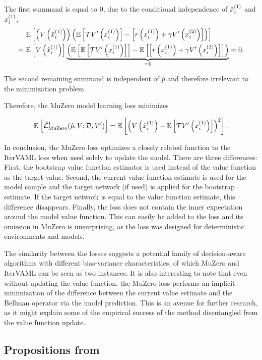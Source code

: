 The first summand is equal to $0$, due to the conditional independence of $\hat{x}^{(1)}_i$ and $x^{(1)}_i$,
\begin{align*}
    &~\mathbb{E}_{}\left[  \left( V\left( \hat{x}^{(1)}_i \right) \right)\left( \mathbb{E}\left[ \mathcal{T}V'\left( x^{(1)}_i \right) \right] - \left[ r\left( x^{(1)}_i \right) + \gamma V'\left( x^{(2)}_{i} \right)  \right] \right) \right]\\
    =&~\mathbb{E}_{}\left[  V\left( \hat{x}^{(1)}_i \right) \right] \underbrace{\left( \mathbb{E}_{}\left[  \mathbb{E}\left[ \mathcal{T}V'\left( x^{(1)}_i \right) \right] \right] - \mathbb{E}_{}\left[  \left[ r\left( x^{(1)}_i \right) + \gamma V'\left( x^{(2)}_{i} \right)  \right] \right] \right)}_{= 0} = 0.
\end{align*}

The second remaining summand is independent of $\hat{p}$ and therefore irrelevant to the minimization problem.

Therefore, the MuZero model learning loss minimizes

\begin{align*}
    \mathbb{E}_{}\left[  \hat{\mathcal{L}}^1_\text{MuZero}(\hat{p}, V; \mathcal{D}, V') \right] = \mathbb{E}_{}\left[   \left( V\left( \hat{x}^{(1)}_i \right) - \mathbb{E}\left[ \mathcal{T}V'\left( x^{(1)}_i \right) \right] \right)^2 \right].
\end{align*}

In conclusion, the MuZero loss optimizes a closely related function to the IterVAML loss when used solely to update the model.
There are three differences:
First, the bootstrap value function estimator is used instead of the value function as the target value.
Second, the current value function estimate is used for the model sample and the target network (if used) is applied for the bootstrap estimate. If the target network is equal to the value function estimate, this difference disappears.
Finally, the loss does not contain the inner expectation around the model value function.
This can easily be added to the loss and its omission in MuZero is unsurprising, as the loss was designed for deterministic environments and models.

The similarity between the losses suggests a potential family of decision-aware algorithms with different bias-variance characteristics, of which MuZero and IterVAML can be seen as two instances.
It is also interesting to note that even without updating the value function, the MuZero loss performs an implicit minimization of the difference between the current value estimate and the Bellman operator via the model prediction.
This is an avenue for further research, as it might explain some of the empirical success of the method disentangled from the value function update.

\subsection{Propositions from \cite{BertsekasShreve1978}}
\label{sec:bertsekas}

